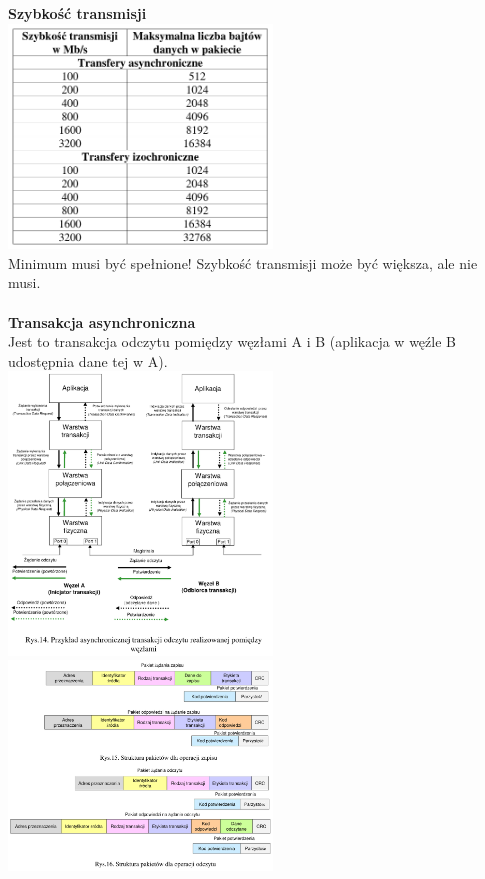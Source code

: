 	\textbf{Szybkość transmisji}\\
	\includegraphics[width=7cm]{./wyklady/FIREWIRE_16_1.pdf}\\
	Minimum musi być spełnione! Szybkość transmisji może być większa, ale nie musi.
	\\\\
	\textbf{Transakcja asynchroniczna}\\
	Jest to transakcja odczytu pomiędzy węzłami A i B (aplikacja w węźle B udostępnia dane tej w A).\\
	\includegraphics[width=7cm]{./wyklady/FIREWIRE_17_1.pdf}
	\includegraphics[width=7cm]{./wyklady/FIREWIRE_18_1.pdf}\\\\
